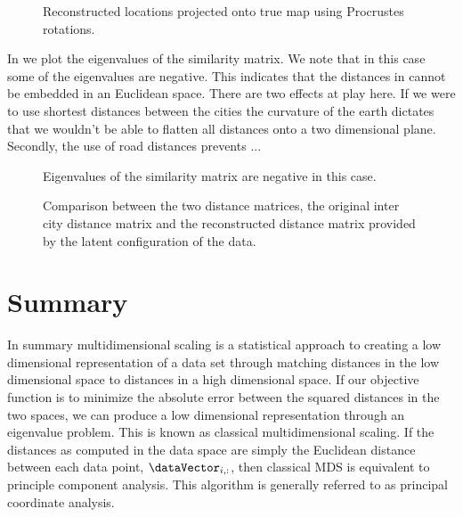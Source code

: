 % 
\begin{figure}
  \begin{centering}
    
  \end{centering}

  \caption{Reconstructed locations projected
    onto true map using Procrustes rotations.}

\end{figure}

In  we plot the eigenvalues of the
similarity matrix. We note that in this case some of the eigenvalues
are negative. This indicates that the distances in 
cannot be embedded in an Euclidean space. There are two effects at
play here. If we were to use shortest distances between the cities the
curvature of the earth dictates that we wouldn't be able to flatten
all distances onto a two dimensional plane. Secondly, the use of road
distances prevents ...
% 
\begin{figure}
  \begin{center}
    
  \end{center}

  \caption{Eigenvalues of the similarity matrix are negative in this
    case.}\label{fig:roadEigenvalues}

\end{figure}


% 
\begin{figure}
  \hfill

  \caption{Comparison between the two distance matrices, the original
    inter city distance matrix and the reconstructed distance matrix
    provided by the latent configuration of the data.}

\end{figure}

\section{Summary}

In summary multidimensional scaling is a statistical approach to creating a low dimensional
representation of a data set through matching distances in the low
dimensional space to distances in a high dimensional space. If our
objective function is to minimize the absolute error between the
squared distances in the two spaces, we can produce a low dimensional
representation through an eigenvalue problem. This is known as
classical multidimensional scaling. If the
distances as computed in the data space are simply the Euclidean
distance between each data point, $\dataVector_{i,:}$, then classical
MDS is equivalent to principle component analysis. This algorithm is generally referred to
as principal coordinate analysis.

